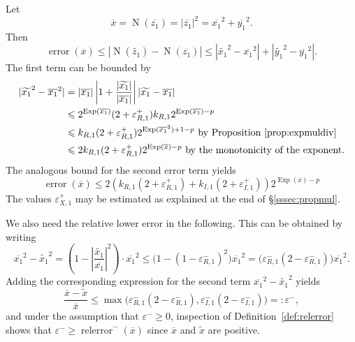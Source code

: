 \documentclass {article}
\newcommand {\corr}[1]{\widetilde {#1}}
\newcommand {\appro}[1]{\overline {#1}}
\DeclareMathOperator{\Exp}{\operatorname {Exp}}
\newcommand{\error}{\operatorname {error}}
\newcommand{\relerror}{\operatorname {relerror}}
\newcommand{\Norm}{\operatorname {N}}
\renewcommand {\epsilon}{\varepsilon}
\renewcommand {\leq}{\leqslant}
\renewcommand {\geq}{\geqslant}
\begin{document}
Let
\[
\appro x = \Norm (\appro {z_1}) = |\appro {z_1}|^2
= \appro {x_1}^2 + \appro {y_1}^2.
\]
Then
\[
\error (\appro x) \leq
| \Norm (\corr {z_1}) - \Norm (\appro {z_1}) |
\leq | \corr {x_1}^2 - \appro {x_1}^2 | + | \corr {y_1}^2 - \appro {y_1}^2 |.
\]
The first term can be bounded by
\begin {align*}
| \corr {x_1}^2 - \appro {x_1}^2 |
& = |\appro {x_1}| \left| 1 + \frac {|\corr {x_1}|}{|\appro {x_1}|} \right|
    |\corr {x_1} - \appro {x_1}| \\
& \leq 2^{\Exp (\appro {x_1})} (2 + \epsilon_{R, 1}^+) k_{R, 1}
2^{\Exp (\appro {x_1}) - p} \\
& \leq k_{R, 1} (2 + \epsilon_{R, 1}^+) 2^{\Exp (\appro {x_1}^2) + 1 - p}
\text { by Proposition~\ref {prop:expmuldiv}} \\
& \leq 2 k_{R, 1} (2 + \epsilon_{R, 1}^+) 2^{\Exp (\appro x) - p}
\text { by the monotonicity of the exponent.}
\end {align*}
The analogous bound for the second error term yields
\begin {equation}
\label {eq:propnorm}
\error (\appro x) \leq
  2 \left(
       k_{R, 1} (2 + \epsilon_{R, 1}^+)
     + k_{I, 1} (2 + \epsilon_{I, 1}^+)
\right)
2^{\Exp (\appro x) - p}
\end {equation}
The values $\epsilon_{X, 1}^+$ may be estimated as explained at the end
of \S\ref {sssec:propmul}.

We also need the relative lower error in the following. This can be obtained
by writing
\[
\appro {x_1}^2 - \corr {x_1}^2
=
\left( 1 - \left| \frac {\corr {x_1}}{\appro {x_1}} \right|^2 \right)
\cdot \appro {x_1}^2
\leq
\big( 1 - (1 - \epsilon_{R, 1}^-)^2 \big) \appro {x_1}^2
=
\big( \epsilon_{R, 1}^- (2 - \epsilon_{R, 1}^-) \big) \appro {x_1}^2.
\]
Adding the corresponding expression for the second term
$\appro {x_1}^2 - \corr {x_1}^2$ yields
\begin {equation}
\label {eq:propnormepsminus}
\frac {\appro x - \corr x}{\appro x}
\leq
\max \big(
   \epsilon_{R, 1}^- (2 - \epsilon_{R, 1}^-),
   \epsilon_{I, 1}^- (2 - \epsilon_{I, 1}^-)
\big)
=: \epsilon^-,
\end {equation}
and under the assumption that $\epsilon^- \geq 0$, inspection of
Definition~\ref {def:relerror} shows that
$\epsilon^- \geq \relerror^- (\appro x)$ since
$\appro x$ and $\corr x$ are positive.
\end{document}
